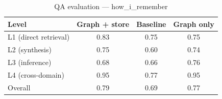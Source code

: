 \begin{table}[h]
\centering
\caption{QA evaluation — how_i_remember}
\begin{tabular}{lccc}
\toprule
Level & Graph + store & Baseline & Graph only \\
\midrule
L1 (direct retrieval) & 0.83 & 0.75 & 0.75 \\
L2 (synthesis) & 0.75 & 0.60 & 0.74 \\
L3 (inference) & 0.68 & 0.66 & 0.76 \\
L4 (cross-domain) & 0.95 & 0.77 & 0.95 \\
\midrule
Overall & 0.79 & 0.69 & 0.77 \\
\bottomrule
\end{tabular}
\end{table}
